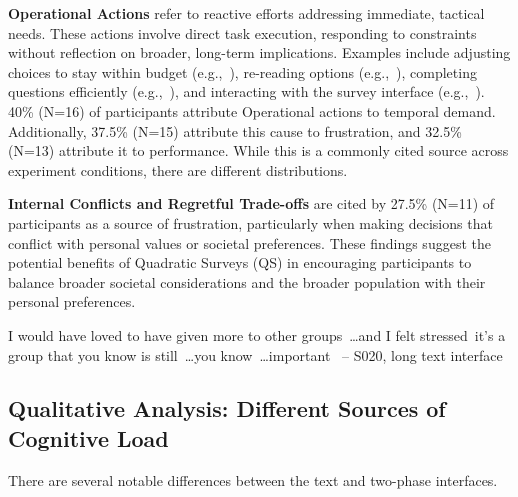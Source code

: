 \textbf{Operational Actions} refer to reactive efforts addressing immediate, tactical needs. These actions involve direct task execution, responding to constraints without reflection on broader, long-term implications. Examples include adjusting choices to stay within budget (e.g.,~), re-reading options (e.g.,~), completing questions efficiently (e.g.,~), and interacting with the survey interface (e.g.,~). 40\% (N=16) of participants attribute Operational actions to temporal demand. Additionally, 37.5\% (N=15) attribute this cause to frustration, and 32.5\% (N=13) attribute it to performance. While this is a commonly cited source across experiment conditions, there are different distributions. 

\textbf{Internal Conflicts and Regretful Trade-offs} are cited by 27.5\% (N=11) of participants as a source of frustration, particularly when making decisions that conflict with personal values or societal preferences. These findings suggest the potential benefits of Quadratic Surveys (QS) in encouraging participants to balance broader societal considerations and the broader population with their personal preferences.

\begin{displayquote}
I would have loved to have given more to other groups~\ldots and I felt stressed~\bracketellipsis it's a group that you know is still~\ldots you know~\ldots important~\bracketellipsis
\noindent \hfill -- S020, long text interface
\end{displayquote}


\subsection{Qualitative Analysis: Different Sources of Cognitive Load}
There are several notable differences between the text and two-phase interfaces. 


